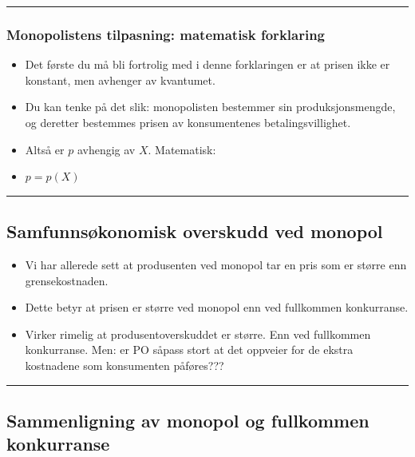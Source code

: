 \documentclass[
  letterpaper,
  DIV=11,
  numbers=noendperiod]{scrartcl}
\providecommand{\tightlist}{%
  \setlength{\itemsep}{0pt}\setlength{\parskip}{0pt}}\usepackage{longtable,booktabs,array}
\begin{document}
\begin{center}\rule{0.5\linewidth}{0.5pt}\end{center}

\subsubsection{Monopolistens tilpasning: matematisk
forklaring}\label{monopolistens-tilpasning-matematisk-forklaring}

\begin{itemize}
\tightlist
\item
  Det første du må bli fortrolig med i denne forklaringen er at prisen
  ikke er konstant, men avhenger av kvantumet.
\item
  Du kan tenke på det slik: monopolisten bestemmer sin
  produksjonsmengde, og deretter bestemmes prisen av konsumentenes
  betalingsvillighet.
\item
  Altså er \(p\) avhengig av \(X\). Matematisk:
\item
  \(p = p(X)\)
\end{itemize}

\begin{center}\rule{0.5\linewidth}{0.5pt}\end{center}

\subsection{Samfunnsøkonomisk overskudd ved
monopol}\label{samfunnsuxf8konomisk-overskudd-ved-monopol}

\begin{itemize}
\tightlist
\item
  Vi har allerede sett at produsenten ved monopol tar en pris som er
  større enn grensekostnaden.
\item
  Dette betyr at prisen er større ved monopol enn ved fullkommen
  konkurranse.
\item
  Virker rimelig at produsentoverskuddet er større. Enn ved fullkommen
  konkurranse. Men: er PO såpass stort at det oppveier for de ekstra
  kostnadene som konsumenten påføres???
\end{itemize}

\begin{center}\rule{0.5\linewidth}{0.5pt}\end{center}

\subsection{Sammenligning av monopol og fullkommen
konkurranse}\label{sammenligning-av-monopol-og-fullkommen-konkurranse}
\end{document}
